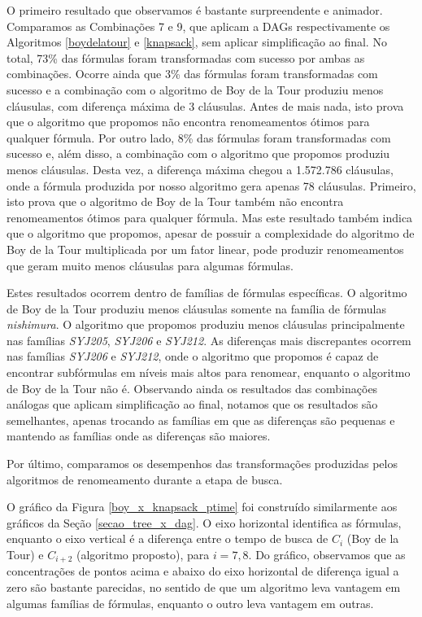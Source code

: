 O primeiro resultado que observamos é bastante surpreendente e animador. Comparamos as Combinações 7 e 9, que aplicam a DAGs respectivamente os Algoritmos \ref{boydelatour} e \ref{knapsack}, sem aplicar simplificação ao final. No total, 73\% das fórmulas foram transformadas com sucesso por ambas as combinações. Ocorre ainda que 3\% das fórmulas foram transformadas com sucesso e a combinação com o algoritmo de Boy de la Tour produziu menos cláusulas, com diferença máxima de 3 cláusulas. Antes de mais nada, isto prova que o algoritmo que propomos não encontra renomeamentos ótimos para qualquer fórmula. Por outro lado, 8\% das fórmulas foram transformadas com sucesso e, além disso, a combinação com o algoritmo que propomos produziu menos cláusulas. Desta vez, a diferença máxima chegou a 1.572.786 cláusulas, onde a fórmula produzida por nosso algoritmo gera apenas 78 cláusulas. Primeiro, isto prova que o algoritmo de Boy de la Tour também não encontra renomeamentos ótimos para qualquer fórmula. Mas este resultado também indica que o algoritmo que propomos, apesar de possuir a complexidade do algoritmo de Boy de la Tour multiplicada por um fator linear, pode produzir renomeamentos que geram muito menos cláusulas para algumas fórmulas.

Estes resultados ocorrem dentro de famílias de fórmulas específicas. O algoritmo de Boy de la Tour produziu menos cláusulas somente na família de fórmulas \emph{nishimura}. O algoritmo que propomos produziu menos cláusulas principalmente nas famílias \emph{SYJ205}, \emph{SYJ206} e \emph{SYJ212}. As diferenças mais discrepantes ocorrem nas famílias \emph{SYJ206} e \emph{SYJ212}, onde o algoritmo que propomos é capaz de encontrar subfórmulas em níveis mais altos para renomear, enquanto o algoritmo de Boy de la Tour não é. Observando ainda os resultados das combinações análogas que aplicam simplificação ao final, notamos que os resultados são semelhantes, apenas trocando as famílias em que as diferenças são pequenas e mantendo as famílias onde as diferenças são maiores.


Por último, comparamos os desempenhos das transformações produzidas pelos algoritmos de renomeamento durante a etapa de busca.

O gráfico da Figura \ref{boy_x_knapsack_ptime} foi construído similarmente aos gráficos da Seção \ref{secao_tree_x_dag}. O eixo horizontal identifica as fórmulas, enquanto o eixo vertical é a diferença entre o tempo de busca de $C_i$ (Boy de la Tour) e $C_{i+2}$ (algoritmo proposto), para $i=7,8$. Do gráfico, observamos que as concentrações de pontos acima e abaixo do eixo horizontal de diferença igual a zero são bastante parecidas, no sentido de que um algoritmo leva vantagem em algumas famílias de fórmulas, enquanto o outro leva vantagem em outras.

